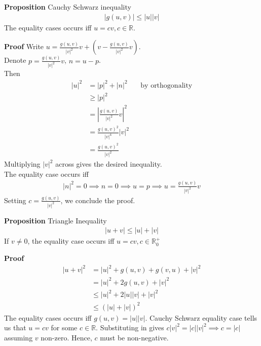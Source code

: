 \documentclass{article}
\begin{document}
\textbf{Proposition} Cauchy Schwarz inequality\\
\begin{align*}
	|g(u,v)| \leq |u||v|
\end{align*}
The equality cases occurs iff $u=cv, c\in \mathbb{R}$.

\textbf{Proof}
Write $u = \frac{g(u,v)}{|v|^2}v + (v-\frac{g(u,v)}{|v|^2}v)$.\\
Denote $p=\frac{g(u,v)}{|v|^2}v$, $n=u-p$.\\
Then
\begin{align*}
	|u|^2 &= |p|^2 + |n|^2 &&\text{by orthogonality}\\
	&\geq |p|^2\\
	&= \left\lvert \frac{g(u,v)}{|v|^2}v \right\rvert^2 \\
	&= \frac{g(u,v)^2}{|v|^4} |v|^2\\
	&= \frac{g(u,v)^2}{|v|^2}
\end{align*}
Multiplying $|v|^2$ across gives the desired inequality.\\
The equality case occurs iff
\begin{align*}
	|n|^2=0 \implies n=0\implies u=p \implies u = \frac{g(u,v)}{|v|^2}v
\end{align*}
Setting $c=\frac{g(u,v)}{|v|^2}$, we conclude the proof.

\textbf{Proposition} Triangle Inequality
\begin{align*}
	|u+v| \leq |u| + |v|
\end{align*}
If $v\neq 0$, the equality case occurs iff $u=cv, c\in \mathbb{R}^+_0$

\textbf{Proof}
\begin{align*}
	|u+v|^2 &= |u|^2 + g(u,v) + g(v,u) + |v|^2\\
	&= |u|^2 + 2g(u,v) + |v|^2\\
	&\leq |u|^2 + 2|u||v| + |v|^2\\
	&\leq (|u| + |v|)^2
\end{align*}
The equality cases occurs iff $g(u,v)=|u||v|$. Cauchy Schwarz equality case tells us that $u=cv$ for some $c\in \mathbb{R}$. Substituting in gives $c|v|^2=|c||v|^2\implies c=|c|$ assuming $v$ non-zero. Hence, $c$ must be non-negative.
\end{document}
